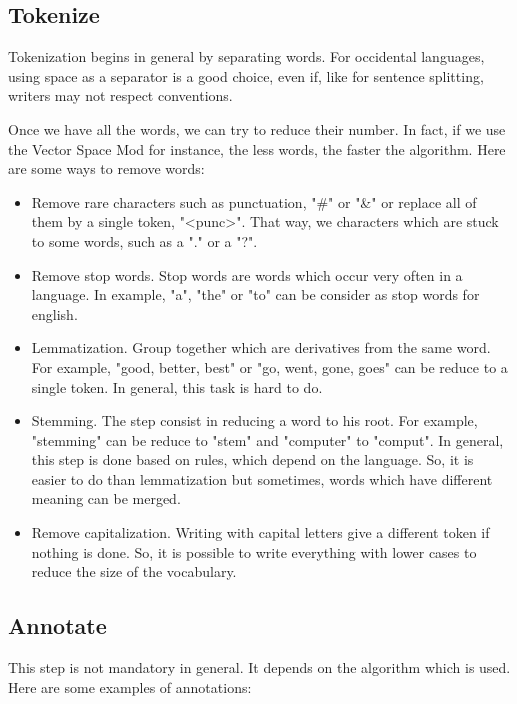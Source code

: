 \documentclass[11pt,a4paper,oldfontcommands]{memoir}
\begin{document}
\subsection{Tokenize}
\label{Tokenize}

Tokenization begins in general by separating words. For occidental languages, using space as a separator is a good choice, even if, like for sentence splitting, writers may not respect conventions.

Once we have all the words, we can try to reduce their number. In fact, if we use the Vector Space Mod for instance, the less words, the faster the algorithm. Here are some ways to remove words:

\begin{itemize}

\item Remove rare characters such as punctuation, "\#" or "\&" or replace all of them by a single token, "<punc>". That way, we characters which are stuck to some words, such as a "." or a "?".
\item Remove stop words. Stop words are words which occur very often in a language. In example, "a", "the" or "to" can be consider as stop words for english.
\item Lemmatization. Group together which are derivatives from the same word. For example, "good, better, best" or "go, went, gone, goes" can be reduce to a single token. In general, this task is hard to do.
\item Stemming. The step consist in reducing a word to his root. For example, "stemming" can be reduce to "stem" and "computer" to "comput". In general, this step is done based on rules, which depend on the language. So, it is easier to do than lemmatization but sometimes, words which have different meaning can be merged.
\item Remove capitalization. Writing with capital letters give a different token if nothing is done. So, it is possible to write everything with lower cases to reduce the size of the vocabulary.

\end{itemize}

\subsection{Annotate}

This step is not mandatory in general. It depends on the algorithm which is used. Here are some examples of annotations:
\end{document}
